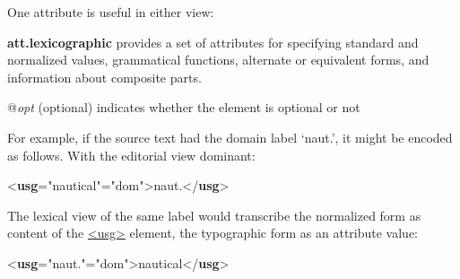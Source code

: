 \par
One attribute is useful in either view:
\begin{sansreflist}
  
\item [\textbf{att.lexicographic}] provides a set of attributes for specifying standard and normalized values, grammatical functions, alternate or equivalent forms, and information about composite parts.\hfil\\[-10pt]\begin{sansreflist}
    \item[@{\itshape opt}]
  (optional) indicates whether the element is optional or not
\end{sansreflist}  
\end{sansreflist}
\par
For example, if the source text had the domain label ‘naut.’, it might be encoded as follows. With the editorial view dominant:\par\bgroup{}\exampleFont \begin{shaded}\noindent\mbox{}{<\textbf{usg}\hspace*{1em}{norm}="{nautical}"\hspace*{1em}{type}="{dom}">}naut.{</\textbf{usg}>}\end{shaded}\egroup\par \noindent  The lexical view of the same label would transcribe the normalized form as content of the \hyperref[TEI.usg]{<usg>} element, the typographic form as an attribute value:\par\bgroup{}\exampleFont \begin{shaded}\noindent\mbox{}{<\textbf{usg}\hspace*{1em}{orig}="{naut.}"\hspace*{1em}{type}="{dom}">}nautical{</\textbf{usg}>}\end{shaded}\egroup\par \par
